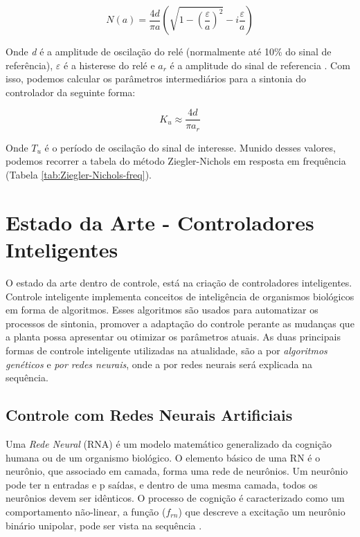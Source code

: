 \begin{equation}\label{eq:n(a)}
  N(a)=\frac{4d}{\pi a}\left(\sqrt{1-\left(\frac{\varepsilon}{a}\right)^{2}}-i\frac{\varepsilon}{a}\right) 
\end{equation}

Onde \textit{d} é a amplitude de oscilação do relé (normalmente até 10\% do sinal de referência), \textit{$\varepsilon$} é a histerese do relé e \textit{$a_r$} é a amplitude do sinal de referencia \cite{Levine1996}. Com isso, podemos calcular os parâmetros intermediários para a sintonia do controlador da seguinte forma:

\begin{equation}
  K_u \approx \frac{4d}{\pi a_r}
\end{equation}

Onde $T_u$ é o período de oscilação do sinal de interesse. Munido desses valores, podemos recorrer a tabela do método Ziegler-Nichols em resposta em frequência (Tabela \ref{tab:Ziegler-Nichols-freq}).



\section{Estado da Arte - Controladores Inteligentes}

O estado da arte dentro de controle, está na criação de controladores inteligentes. Controle inteligente implementa conceitos de inteligência de organismos biológicos em forma de algoritmos. Esses algoritmos são usados para automatizar os processos de sintonia, promover a adaptação do controle perante as mudanças que a planta possa apresentar ou otimizar os parâmetros atuais. As duas principais formas de controle inteligente utilizadas na atualidade, são a por \textit{algoritmos genéticos} e \textit{por redes neurais}, onde a por redes neurais será explicada na sequência.



\subsection{Controle com Redes Neurais Artificiais}  %

Uma \textit{Rede Neural} (RNA) é um modelo matemático generalizado da cognição humana ou de um organismo biológico. O elemento básico de uma RN é o neurônio, que associado em camada, forma uma rede de neurônios. Um neurônio pode ter n entradas e p saídas, e dentro de uma mesma camada, todos os neurônios devem ser idênticos. O processo de cognição é caracterizado como um comportamento não-linear, a função ($f_{rn}$) que descreve a excitação um neurônio binário unipolar,  pode ser vista na sequência \cite{Unal2013}. 

